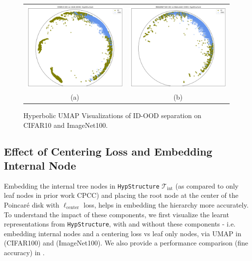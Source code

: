 \begin{figure}[ht]
\centering
\begin{tabular}{cc}
\includegraphics[width=.3\textwidth]{figures/hypstructure_cifar10_poincare_disk_ID_OOD.png}&
\includegraphics[width=.3\textwidth]{figures/hypstructure_im100_poincare_disk_ID_OOD.png}\\
{ (a)}&{ (b)} 
\end{tabular}
\caption{Hyperbolic UMAP Visualizations of ID-OOD separation on CIFAR10 and ImageNet100.}
\label{fig:add_viz_3}
\end{figure}

\subsection{Effect of Centering Loss and Embedding Internal Node}

Embedding the internal tree nodes in \texttt{HypStructure} $\mathcal{T}_{\text{int}}$ (as compared to only leaf nodes in prior work CPCC) and placing the root node at the center of the Poincaré disk with $\ell_{\text{center}}$ loss, helps in embedding the hierarchy more accurately. To understand the impact of these components, we first visualize the learnt representations from \texttt{HypStructure}, with and without these components - i.e. embedding internal nodes and a centering loss vs leaf only nodes, via UMAP in  (CIFAR100) and   (ImageNet100). We also provide a performance comparison (fine accuracy) in .


\begin{table}[ht]
\centering
{}
\vspace{0.4cm}
\caption{Fine accuracy comparison of \texttt{HypStructure} with vs. without internal nodes and centering on CIFAR10, CIFAR100, and ImageNet100 datasets.}
\label{tab:hypstructure_comparison}
\end{table}


